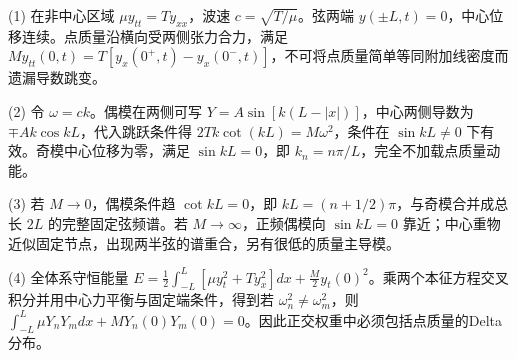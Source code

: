 (1) 在非中心区域 \(\mu y_{tt}=Ty_{xx}\)，波速 \(c=\sqrt{T/\mu}\)。弦两端 \(y(\pm L,t)=0\)，中心位移连续。点质量沿横向受两侧张力合力，满足 \(\boxed{M y_{tt}(0,t)=T[y_x(0^+,t)-y_x(0^-,t)]}\)，不可将点质量简单等同附加线密度而遗漏导数跳变。

(2) 令 \(\omega=ck\)。偶模在两侧可写 \(Y=A\sin[k(L-|x|)]\)，中心两侧导数为 \(\mp Ak\cos kL\)，代入跳跃条件得 \(\boxed{2T k\cot(kL)=M\omega^2}\)，条件在 \(\sin kL\ne0\) 下有效。奇模中心位移为零，满足 \(\sin kL=0\)，即 \(k_n=n\pi/L\)，完全不加载点质量动能。

(3) 若 \(M\to0\)，偶模条件趋 \(\cot kL=0\)，即 \(kL=(n+1/2)\pi\)，与奇模合并成总长 \(2L\) 的完整固定弦频谱。若 \(M\to\infty\)，正频偶模向 \(\sin kL=0\) 靠近；中心重物近似固定节点，出现两半弦的谱重合，另有很低的质量主导模。

(4) 全体系守恒能量 \(E=\frac12\int_{-L}^L[\mu y_t^2+Ty_x^2]dx+\frac M2y_t(0)^2\)。乘两个本征方程交叉积分并用中心力平衡与固定端条件，得到若 \(\omega_n^2\ne\omega_m^2\)，则 \(\int_{-L}^L\mu Y_nY_mdx+M Y_n(0)Y_m(0)=0\)。因此正交权重中必须包括点质量的Delta分布。
